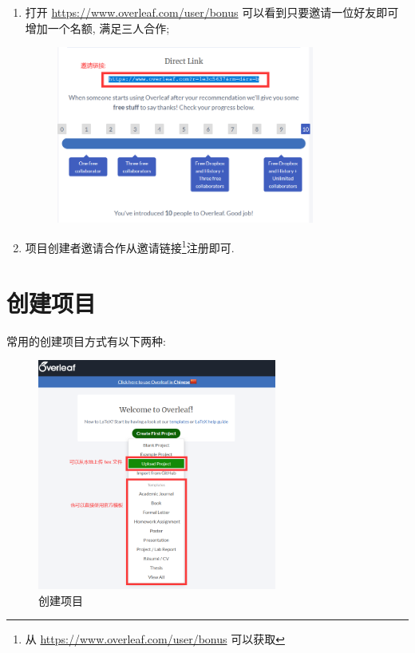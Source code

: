 \documentclass{formatBook}
\begin{document}
\begin{enumerate}
    \item 打开 \url{https://www.overleaf.com/user/bonus}
          可以看到只要邀请一位好友即可增加一个名额, 满足三人合作;
          \begin{figure}[H]
              \centering
              \includegraphics[width=0.8\textwidth]{Guidepics/20210415183943.png}
          \end{figure}
    \item 项目创建者邀请合作从邀请链接\footnote{从 \url{https://www.overleaf.com/user/bonus} 可以获取}注册即可.
\end{enumerate}

\section{创建项目}\label{header-n10}

常用的创建项目方式有以下两种:
\begin{figure}[H]
    \centering
    \includegraphics[width=0.7\textwidth]{Guidepics/20210415183951.png}
    \caption{创建项目}
\end{figure}
\end{document}
